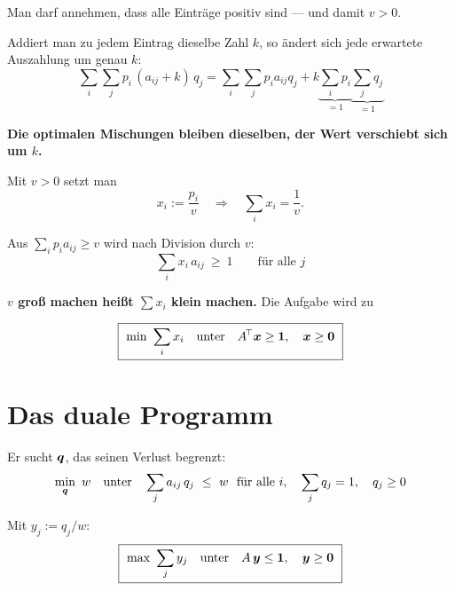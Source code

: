 \begin{merksatz}
Man darf annehmen, dass alle Einträge positiv sind --- und damit $v > 0$.

Addiert man zu jedem Eintrag dieselbe Zahl $k$, so ändert sich jede erwartete Auszahlung um genau $k$:
\[ \sum_i\sum_j p_i\,(a_{ij}+k)\,q_j = \sum_i\sum_j p_i a_{ij} q_j + k\underbrace{\sum_i p_i}_{=1}\underbrace{\sum_j q_j}_{=1} \]

\begin{center}
\begin{minipage}{0.9\textwidth}
\textbf{Die optimalen Mischungen bleiben dieselben, der Wert verschiebt sich um $k$.}
\end{minipage}
\end{center}

Mit $v > 0$ setzt man
\[ x_i := \frac{p_i}{v} \quad\Longrightarrow\quad \sum_i x_i = \frac{1}{v} . \]

Aus $\sum_i p_i a_{ij} \ge v$ wird nach Division durch $v$:
\[ \sum_i x_i\,a_{ij} \ \ge\ 1 \qquad\text{für alle } j \]

\begin{center}
\begin{minipage}{0.9\textwidth}
\textbf{$v$ groß machen heißt $\sum x_i$ klein machen.} Die Aufgabe wird zu
\end{minipage}
\end{center}

\[ \boxed{\ \min\ \sum_i x_i \quad\text{unter}\quad A^{\!\top}\boldsymbol{x} \ge \boldsymbol{1}, \quad \boldsymbol{x} \ge \boldsymbol{0}\ } \]

\begin{center}
\begin{minipage}{0.88\textwidth}
\end{minipage}
\end{center}
\end{merksatz}

\section{Das duale Programm}

\begin{merksatz}
Er sucht $\boldsymbol{q}$, das seinen Verlust begrenzt:
\[ \min_{\boldsymbol{q}}\ w \quad\text{unter}\quad \sum_j a_{ij}\,q_j \ \le\ w \ \ \text{für alle } i, \quad \sum_j q_j = 1, \quad q_j \ge 0 \]

Mit $y_j := q_j/w$:
\[ \boxed{\ \max\ \sum_j y_j \quad\text{unter}\quad A\,\vek y \le \vek 1, \quad \vek y \ge \vek 0\ } \]
\end{merksatz}

